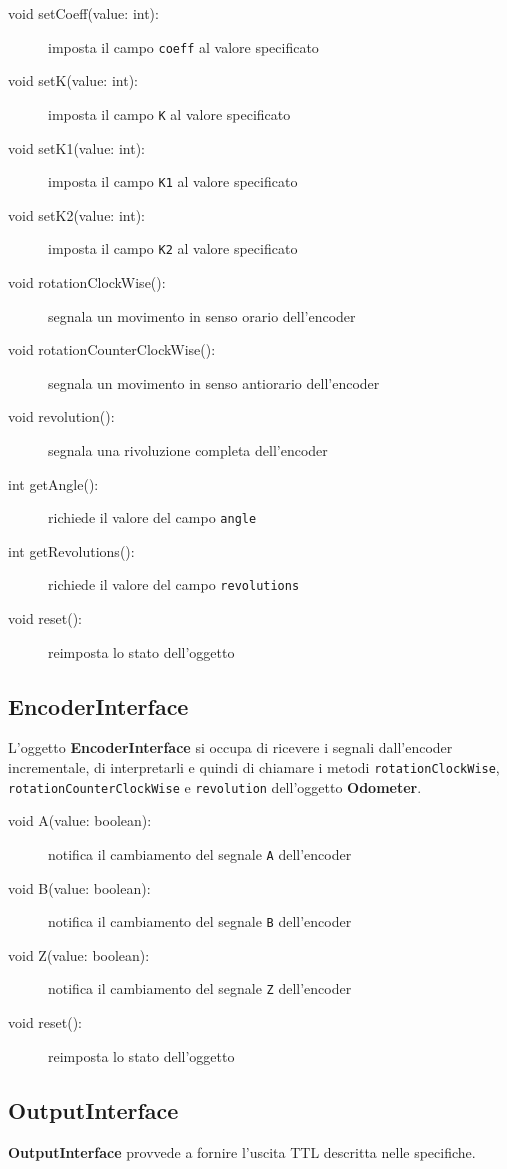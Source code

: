\documentclass [11pt,a4paper,oneside]{article}
\newcommand{\component}[1]{\textbf{#1}}
\newcommand{\identifier}[1]{\texttt{#1}}
\begin{document}
\begin{description}
\item[void setCoeff(value: int):] imposta il campo \identifier{coeff} al
     valore specificato
\item[void setK(value: int):] imposta il campo \identifier{K} al
     valore specificato
\item[void setK1(value: int):] imposta il campo \identifier{K1} al
     valore specificato
\item[void setK2(value: int):] imposta il campo \identifier{K2} al
     valore specificato
\item[void rotationClockWise():] segnala un movimento in senso orario
     dell'encoder
\item[void rotationCounterClockWise():] segnala un movimento in senso 
     antiorario dell'encoder
\item[void revolution():] segnala una rivoluzione completa dell'encoder
\item[int getAngle():] richiede il valore del campo \identifier{angle}
\item[int getRevolutions():] richiede il valore del campo
    \identifier{revolutions}
\item[void reset():] reimposta lo stato dell'oggetto
\end{description}

\subsection{EncoderInterface}
L'oggetto \component{EncoderInterface} si occupa di ricevere i segnali
dall'encoder incrementale, di interpretarli e quindi di chiamare i
metodi \identifier{rotationClockWise}, \identifier{rotationCounterClockWise}
e \identifier{revolution} dell'oggetto \component{Odometer}.

\begin{description}
\item[void A(value: boolean):] notifica il cambiamento del segnale \identifier{A}
    dell'encoder
\item[void B(value: boolean):] notifica il cambiamento del segnale \identifier{B}
    dell'encoder
\item[void Z(value: boolean):] notifica il cambiamento del segnale \identifier{Z}
    dell'encoder
\item[void reset():] reimposta lo stato dell'oggetto
\end{description}

\subsection{OutputInterface}
\component{OutputInterface} provvede a fornire l'uscita TTL descritta nelle
specifiche.
\end{document}
